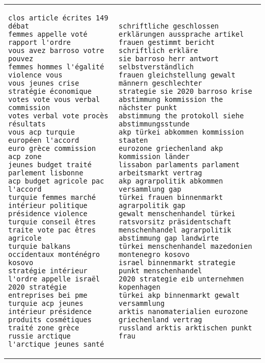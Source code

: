\documentclass{article} %
\begin{document}
\begin{tabular}{p{}p{}}
\begin{verbatim}
clos article écrites 149 débat
femmes appelle voté rapport l'ordre
vous avez barroso votre pouvez
femmes hommes l'égalité violence vous
vous jeunes crise stratégie économique
votes vote vous verbal commission
votes verbal vote procès résultats
vous acp turquie européen l'accord
euro grèce commission acp zone
jeunes budget traité parlement lisbonne
acp budget agricole pac l'accord
turquie femmes marché intérieur politique
présidence violence turquie conseil êtres
traite vote pac êtres agricole
turquie balkans occidentaux monténégro kosovo
stratégie intérieur l'ordre appelle israël
2020 stratégie entreprises bei pme
turquie acp jeunes intérieur présidence
produits cosmétiques traité zone grèce
russie arctique l'arctique jeunes santé
\end{verbatim}&
\begin{verbatim}
schriftliche geschlossen erklärungen aussprache artikel
frauen gestimmt bericht schriftlich erkläre
sie barroso herr antwort selbstverständlich
frauen gleichstellung gewalt männern geschlechter
strategie sie 2020 barroso krise
abstimmung kommission the nächster punkt
abstimmung the protokoll siehe abstimmungsstunde
akp türkei abkommen kommission staaten
eurozone griechenland akp kommission länder
lissabon parlaments parlament arbeitsmarkt vertrag
akp agrarpolitik abkommen versammlung gap
türkei frauen binnenmarkt agrarpolitik gap
gewalt menschenhandel türkei ratsvorsitz präsidentschaft
menschenhandel agrarpolitik abstimmung gap landwirte
türkei menschenhandel mazedonien montenegro kosovo
israel binnenmarkt strategie punkt menschenhandel
2020 strategie eib unternehmen kopenhagen
türkei akp binnenmarkt gewalt versammlung
arktis nanomaterialien eurozone griechenland vertrag
russland arktis arktischen punkt frau
\end{verbatim}
\end{tabular}
\end{document}
